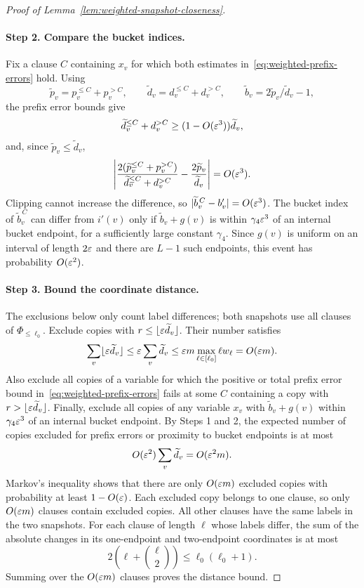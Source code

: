 \begin{proof}[Proof of Lemma~\ref{lem:weighted-snapshot-closeness}]
\paragraph{Step 2. Compare the bucket indices.}
Fix a clause $C$ containing $x_v$ for which both estimates in~\eqref{eq:weighted-prefix-errors} hold.
Using
\[
  \widetilde p_v=p_v^{\le C}+p_v^{>C},\qquad
  \widetilde d_v=d_v^{\le C}+d_v^{>C},\qquad
  \widetilde b_v=2\widetilde p_v/\widetilde d_v-1,
\]
the prefix error bounds give
\[
  \widetilde d_v^{\le C}+d_v^{>C}
  \ge(1-O(\varepsilon^3))\widetilde d_v,
\]
and, since $\widetilde p_v\le\widetilde d_v$,
\[
  \left|
    \frac{2(\widetilde p_v^{\le C}+p_v^{>C})}
         {\widetilde d_v^{\le C}+d_v^{>C}}
    -\frac{2\widetilde p_v}{\widetilde d_v}
  \right|=O(\varepsilon^3).
\]
Clipping cannot increase the difference, so $|\widetilde b_v^{\,C}-b'_v|=O(\varepsilon^3)$.
The bucket index of $\widetilde b_v^{\,C}$ can differ from $i'(v)$ only if $\widetilde b_v+g(v)$ is within $\gamma_4\varepsilon^3$ of an internal bucket endpoint, for a sufficiently large constant $\gamma_4$.
Since $g(v)$ is uniform on an interval of length $2\varepsilon$ and there are $L-1$ such endpoints, this event has probability $O(\varepsilon^2)$.

\paragraph{Step 3. Bound the coordinate distance.}
The exclusions below only count label differences; both snapshots use all clauses of $\Phi_{\le\ell_0}$.
Exclude copies with $r\le\lfloor\varepsilon\widetilde d_v\rfloor$. Their number satisfies
\[
  \sum_v\lfloor\varepsilon\widetilde d_v\rfloor
  \le\varepsilon\sum_v\widetilde d_v
  \le\varepsilon m\max_{\ell\in[\ell_0]}\ell w_\ell=O(\varepsilon m).
\]
Also exclude all copies of a variable for which the positive or total prefix error bound in~\eqref{eq:weighted-prefix-errors} fails at some $C$ containing a copy with $r>\lfloor\varepsilon\widetilde d_v\rfloor$.
Finally, exclude all copies of any variable $x_v$ with $\widetilde b_v+g(v)$ within $\gamma_4\varepsilon^3$ of an internal bucket endpoint.
By Steps 1 and 2, the expected number of copies excluded for prefix errors or proximity to bucket endpoints is at most
\[
  O(\varepsilon^2)\sum_v\widetilde d_v=O(\varepsilon^2m).
\]
Markov's inequality shows that there are only $O(\varepsilon m)$ excluded copies with probability at least $1-O(\varepsilon)$.
Each excluded copy belongs to one clause, so only $O(\varepsilon m)$ clauses contain excluded copies.
All other clauses have the same labels in the two snapshots.
For each clause of length $\ell$ whose labels differ, the sum of the absolute changes in its one-endpoint and two-endpoint coordinates is at most
\[
  2\left(\ell+\binom\ell2\right)\le\ell_0(\ell_0+1).
\]
Summing over the $O(\varepsilon m)$ clauses proves the distance bound.

\end{proof}
